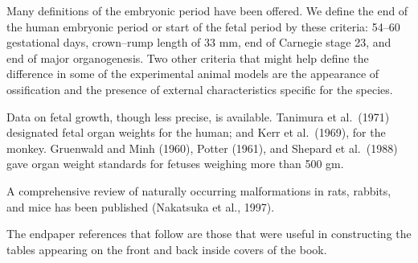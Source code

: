 Many definitions of the embryonic period have been offered. We define
the end of the human embryonic period or start of the fetal period by
these criteria:  54--60 gestational days, crown--rump length of 33 mm,
end of Carnegie stage 23, and end of major organogenesis. Two other
criteria that might help define the difference in some of the
experimental animal models are the appearance of ossification and the
presence of external characteristics specific for the species.

Data on fetal growth, though less precise, is available.
Tanimura et al.~(1971) designated fetal organ weights for
the human; and Kerr et al.~(1969), for the monkey. Gruenwald and Minh
(1960), Potter (1961), and Shepard et al.~(1988) gave organ weight
standards for fetuses weighing more than 500 gm.

A comprehensive review of naturally occurring malformations in rats,
rabbits, and mice has been published (Nakatsuka et al., 1997).

The endpaper references that follow are those that 
were useful in constructing the tables
appearing on the front and back inside covers of the book.

\newpage

